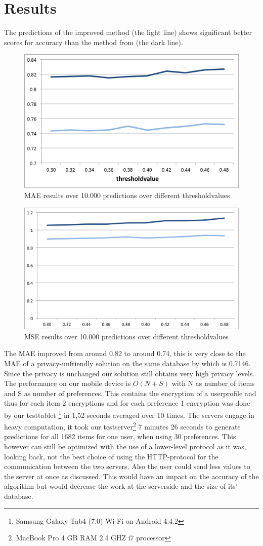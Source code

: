 \documentclass[twocolumn]{phdsymp} %
\begin{document}
\section{Results}
The predictions of the improved method (the light line)  shows significant better scores for accuracy than the method from \cite{dyn} (the dark line). 

\begin{figure}[ht]
\begin{center}
	\includegraphics[width=.40\textwidth]{mae}
	\caption{MAE results over 10.000 predictions over different thresholdvalues}
\end{center}
\end{figure}
\begin{figure}[ht]
\begin{center}
	\includegraphics[width=.40\textwidth]{mse}
	\caption{MSE results over 10.000 predictions over different thresholdvalues}
\end{center}
\end{figure}

The MAE improved from around 0.82 to around 0.74, this is very close to the MAE of a privacy-unfriendly solution on the same database by \cite{rand} which is 0.7146. Since the privacy is unchanged our solution still obtains very high privacy levels. The performance on our mobile device is $O(N+S)$ with N as number of items and S as number of preferences. This contains the encryption of a userprofile and thus for each item 2 encryptions and for each preference 1 encryption was done by our testtablet \footnote{Samsung Galaxy Tab4 (7.0) Wi-Fi on Android 4.4.2} in 1,52 seconds averaged over 10 times. The servers engage in heavy computation, it took our testserver\footnote{MacBook Pro 4 GB RAM 2.4 GHZ i7 processor} 7 minutes 26 seconds to generate predictions for all 1682 items for one user, when using 30 preferences. This however can still be optimized with the use of a lower-level protocol as it was, looking back, not the best choice of using the HTTP-protocol for the communication between the two servers. Also the user could send less values to the server at once as discussed. This would have an impact on the accuracy of the algorithm but would decrease the work at the serverside and the size of its' database.
\end{document}
